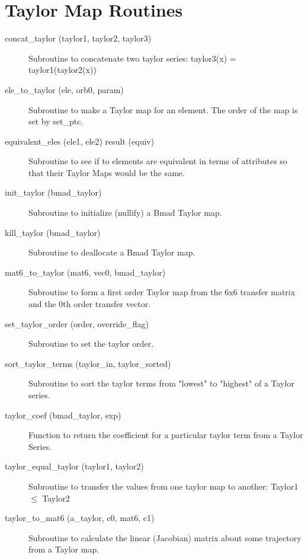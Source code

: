 \section{Taylor Map Routines}
\label{r:taylor}   

\begin{description}

\item[concat\_taylor (taylor1, taylor2, taylor3)] \Newline
Subroutine to concatenate two taylor series: taylor3(x) = taylor1(taylor2(x)) 

\item[ele\_to\_taylor (ele, orb0, param)] \Newline
Subroutine to make a Taylor map for an element. The order of the map is set by set\_ptc.

\item[equivalent\_eles (ele1, ele2) result (equiv)] \Newline 
Subroutine to see if to elements are equivalent in terms of attributes so
that their Taylor Maps would be the same. 

\item[init\_taylor (bmad\_taylor)] \Newline
Subroutine to initialize (nullify) a Bmad Taylor map. 

\item[kill\_taylor (bmad\_taylor)] \Newline
Subroutine to deallocate a Bmad Taylor map. 

\item[mat6\_to\_taylor (mat6, vec0, bmad\_taylor)] \Newline
Subroutine to form a first order Taylor map from the 6x6 transfer matrix 
and the 0th order transfer vector. 

\item[set\_taylor\_order (order, override\_flag)] \Newline
Subroutine to set the taylor order. 

\item[sort\_taylor\_terms (taylor\_in, taylor\_sorted)] \Newline
Subroutine to sort the taylor terms from "lowest" to "highest" of a Taylor series. 

\item[taylor\_coef (bmad\_taylor, exp)] \Newline 
Function to return the coefficient for a particular taylor term from a Taylor Series.

\item[taylor\_equal\_taylor (taylor1, taylor2)] \Newline
Subroutine to transfer the values from one taylor map to another: Taylor1 $\le$ Taylor2 

\item[taylor\_to\_mat6 (a\_taylor, c0, mat6, c1)] \Newline
Subroutine to calculate the linear (Jacobian) matrix about some trajectory from a Taylor map. 


\end{description}
